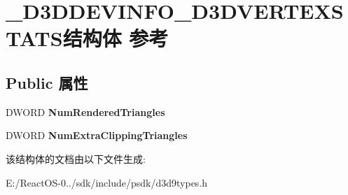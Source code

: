 \hypertarget{struct___d3_d_d_e_v_i_n_f_o___d3_d_v_e_r_t_e_x_s_t_a_t_s}{}\section{\+\_\+\+D3\+D\+D\+E\+V\+I\+N\+F\+O\+\_\+\+D3\+D\+V\+E\+R\+T\+E\+X\+S\+T\+A\+T\+S结构体 参考}
\label{struct___d3_d_d_e_v_i_n_f_o___d3_d_v_e_r_t_e_x_s_t_a_t_s}
\subsection*{Public 属性}
\begin{DoxyCompactItemize}
\item 
\mbox{\label{struct___d3_d_d_e_v_i_n_f_o___d3_d_v_e_r_t_e_x_s_t_a_t_s_ac8ddfd683ac358f974e1db6a0c16c02c}} 
D\+W\+O\+RD {\bfseries Num\+Rendered\+Triangles}
\item 
\mbox{\label{struct___d3_d_d_e_v_i_n_f_o___d3_d_v_e_r_t_e_x_s_t_a_t_s_a0c1fed6dad964d205b92798322805a67}} 
D\+W\+O\+RD {\bfseries Num\+Extra\+Clipping\+Triangles}
\end{DoxyCompactItemize}


该结构体的文档由以下文件生成\+:\begin{DoxyCompactItemize}
\item 
E\+:/\+React\+O\+S-\/0../sdk/include/psdk/d3d9types.\+h\end{DoxyCompactItemize}
